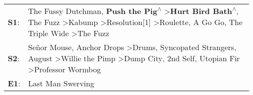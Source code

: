 \begin{supertabular}{p{0.03\textwidth}p{0.92\textwidth}}
 \textbf{S1}:  &  The Fussy Dutchman\textsuperscript{}, \enspace \textbf{Push the Pig\textsuperscript{$\wedge$}} \textgreater \enspace \textbf{Hurt Bird Bath\textsuperscript{$\wedge$}}, \enspace The Fuzz\textsuperscript{} \textgreater \enspace Kabump\textsuperscript{} \textgreater \enspace Resolution[1]\textsuperscript{} \textgreater \enspace Roulette\textsuperscript{}, \enspace A Go Go\textsuperscript{}, \enspace The Triple Wide\textsuperscript{} \textgreater \enspace The Fuzz\textsuperscript{}  \enspace  \\
 \textbf{S2}:  &                                           Señor Mouse\textsuperscript{}, \enspace Anchor Drops\textsuperscript{} \textgreater \enspace Drums\textsuperscript{}, \enspace Syncopated Strangers\textsuperscript{}, \enspace August\textsuperscript{} \textgreater \enspace Willie the Pimp\textsuperscript{} \textgreater \enspace Dump City\textsuperscript{}, \enspace 2nd Self\textsuperscript{}, \enspace Utopian Fir\textsuperscript{} \textgreater \enspace Professor Wormbog\textsuperscript{}  \enspace  \\
 \textbf{E1}:  &                                                                                                                                                                                                                                                                                                                                                                                                                                                                 Last Man Swerving\textsuperscript{}  \enspace  \\
\end{supertabular}
